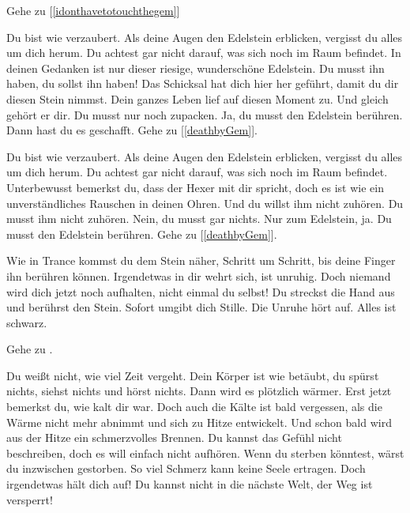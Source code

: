 Gehe zu [\ref{idonthavetotouchthegem}]


Du bist wie verzaubert. Als deine Augen den Edelstein erblicken, vergisst du alles um dich herum. Du achtest gar nicht darauf, was sich noch im Raum befindet.
In deinen Gedanken ist nur dieser riesige, wunderschöne Edelstein.
Du musst ihn haben, du sollst ihn haben! Das Schicksal hat dich hier her geführt, damit du dir diesen Stein nimmst. Dein ganzes Leben lief auf diesen Moment zu. Und gleich gehört er dir. Du musst nur noch zupacken. Ja, du musst den Edelstein berühren. Dann hast du es geschafft. Gehe zu [\ref{deathbyGem}].


Du bist wie verzaubert. Als deine Augen den Edelstein erblicken, vergisst du alles um dich herum. Du achtest gar nicht darauf, was sich noch im Raum befindet. Unterbewusst bemerkst du, dass der Hexer mit dir spricht, doch es ist wie ein unverständliches Rauschen in deinen Ohren. Und du willst ihm nicht zuhören. Du musst ihm nicht zuhören. Nein, du musst gar nichts. Nur zum Edelstein, ja. Du musst den Edelstein berühren. Gehe zu [\ref{deathbyGem}].


Wie in Trance kommst du dem Stein näher, Schritt um Schritt, bis deine Finger ihn berühren können. Irgendetwas in dir wehrt sich, ist unruhig. Doch niemand wird dich jetzt noch aufhalten, nicht einmal du selbst! Du streckst die Hand aus und berührst den Stein. Sofort umgibt dich Stille. Die Unruhe hört auf. Alles ist schwarz.

Gehe zu .


Du weißt nicht, wie viel Zeit vergeht. Dein Körper ist wie betäubt, du spürst nichts, siehst nichts und hörst nichts. Dann wird es plötzlich wärmer. Erst jetzt bemerkst du, wie kalt dir war. Doch auch die Kälte ist bald vergessen, als die Wärme nicht mehr abnimmt und sich zu Hitze entwickelt. Und schon bald wird aus der Hitze ein schmerzvolles Brennen. Du kannst das Gefühl nicht beschreiben, doch es will einfach nicht aufhören. Wenn du sterben könntest, wärst du inzwischen gestorben. So viel Schmerz kann keine Seele ertragen. Doch irgendetwas hält dich auf! Du kannst nicht in die nächste Welt, der Weg ist versperrt!

